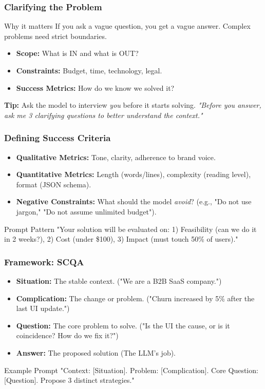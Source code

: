 \documentclass{beamer}
\begin{document}
\begin{frame}
    \frametitle{Clarifying the Problem}
    \begin{block}{Why it matters}
        If you ask a vague question, you get a vague answer. Complex problems need strict boundaries.
    \end{block}
    \begin{itemize}
        \item \textbf{Scope:} What is IN and what is OUT?
        \item \textbf{Constraints:} Budget, time, technology, legal.
        \item \textbf{Success Metrics:} How do we know we solved it?
    \end{itemize}
    \vspace{0.5cm}
    \textbf{Tip:} Ask the model to interview \textit{you} before it starts solving.
    \textit{"Before you answer, ask me 3 clarifying questions to better understand the context."}
\end{frame}

\begin{frame}
    \frametitle{Defining Success Criteria}
    \begin{itemize}
        \item \textbf{Qualitative Metrics:} Tone, clarity, adherence to brand voice.
        \item \textbf{Quantitative Metrics:} Length (words/lines), complexity (reading level), format (JSON schema).
        \item \textbf{Negative Constraints:} What should the model \textit{avoid}? (e.g., "Do not use jargon," "Do not assume unlimited budget").
    \end{itemize}
    \begin{block}{Prompt Pattern}
        "Your solution will be evaluated on: 1) Feasibility (can we do it in 2 weeks?), 2) Cost (under \$100), 3) Impact (must touch 50\% of users)."
    \end{block}
\end{frame}

\begin{frame}
    \frametitle{Framework: SCQA}
    \begin{itemize}
        \item \textbf{Situation:} The stable context. ("We are a B2B SaaS company.")
        \item \textbf{Complication:} The change or problem. ("Churn increased by 5\% after the last UI update.")
        \item \textbf{Question:} The core problem to solve. ("Is the UI the cause, or is it coincidence? How do we fix it?")
        \item \textbf{Answer:} The proposed solution (The LLM's job).
    \end{itemize}
    \begin{block}{Example Prompt}
        "Context: [Situation]. Problem: [Complication]. Core Question: [Question]. Propose 3 distinct strategies."
    \end{block}
\end{frame}
\end{document}
